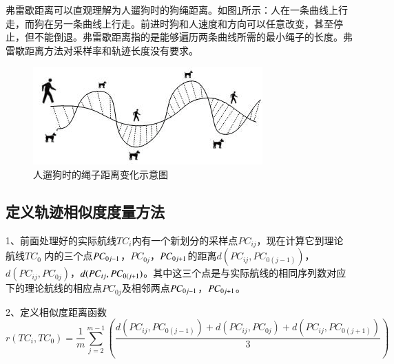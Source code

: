 \documentclass[GBK]{ctexart}
\begin{document}
\begin{spacing}{1.5}
弗雷歇距离可以直观理解为人遛狗时的狗绳距离。如图\ref{flx}所示：人在一条曲线上行走，而狗在另一条曲线上行走。前进时狗和人速度和方向可以任意改变，甚至停止，但不能倒退。弗雷歇距离指的是能够遍历两条曲线所需的最小绳子的长度。弗雷歇距离方法对采样率和轨迹长度没有要求。
\begin{figure}[H]
  \centering
  \includegraphics[scale=0.8]{flx}
  \caption{人遛狗时的绳子距离变化示意图}\label{flx}
\end{figure}
\subsection{定义轨迹相似度度量方法}
1、前面处理好的实际航线$T{C_i}$内有一个新划分的采样点$P{C_{ij}}$，现在计算它到理论航线$T{C_0}$ 内的三个点$P{C_{0j{\rm{ - }}1}}$，$P{C_{0j}}$，$P{C_{0j{\rm{ + }}1}}$的距离$d(P{C_{ij}},P{C_{0(j - 1)}})$，$d(P{C_{ij}},P{C_{0j}})$，$d(P{C_{ij}},P{C_{0(j{\rm{ + }}1}})$。其中这三个点是与实际航线的相同序列数对应下的理论航线的相应点$P{C_{0j}}$及相邻两点$P{C_{0j{\rm{ - }}1}}$，$P{C_{0j{\rm{ + }}1}}$。

2、定义相似度距离函数
\begin{equation}\label{e0}
   r(T{C_i},T{C_0}) = \frac{1}{m}\sum\limits_{j = 2}^{m - 1} {(\frac{{d(P{C_{ij}},P{C_{0(j - 1)}}) + d(P{C_{ij}},P{C_{0j}}) + d(P{C_{ij}},P{C_{0(j + 1)}})}}{3})}
\end{equation}


\end{spacing}
\end{document}
